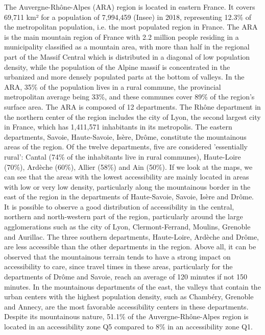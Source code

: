 The Auvergne-Rhône-Alpes (ARA) region is located in eastern France. It covers 69,711 km² for a population of 7,994,459 (Insee) in 2018, representing 12.3\% of the metropolitan population, i.e. the most populated region in France. The ARA is the main mountain region of France with 2.2 million people residing in a municipality classified as a mountain area, with more than half in the regional part of the Massif Central which is distributed in a diagonal of low population density, while the population of the Alpine massif is concentrated in the urbanized and more densely populated parts at the bottom of valleys. In the ARA, 35\% of the population lives in a rural commune, the provincial metropolitan average being 33\%, and these communes cover 89\% of the region's surface area. The ARA is composed of 12 departments. The Rhône department in the northern center of the region includes the city of Lyon, the second largest city in France, which has 1,411,571 inhabitants in its metropolis. The eastern departments, Savoie, Haute-Savoie, Isère, Drôme, constitute the mountainous areas of the region. Of the twelve departments, five are considered 'essentially rural': Cantal (74\% of the inhabitants live in rural communes), Haute-Loire (70\%), Ardèche (60\%), Allier (58\%) and Ain (50\%). If we look at the maps, we can see that the areas with the lowest accessibility are mainly located in areas with low or very low density, particularly along the mountainous border in the east of the region in the departments of Haute-Savoie, Savoie, Isère and Drôme. It is possible to observe a good distribution of accessibility in the central, northern and north-western part of the region, particularly around the large agglomerations such as the city of Lyon, Clermont-Ferrand, Moulins, Grenoble and Aurillac. The three southern departments, Haute-Loire, Ardèche and Drôme, are less accessible than the other departments in the region. Above all, it can be observed that the mountainous terrain tends to have a strong impact on accessibility to care, since travel times in these areas, particularly for the departments of Drôme and Savoie, reach an average of 120 minutes if not 150 minutes. In the mountainous departments of the east, the valleys that contain the urban centers with the highest population density, such as Chambéry, Grenoble and Annecy, are the most favorable accessibility centers in these departments. Despite its mountainous nature, 51.1\% of the Auvergne-Rhône-Alpes region is located in an accessibility zone Q5 compared to 8\% in an accessibility zone Q1.


